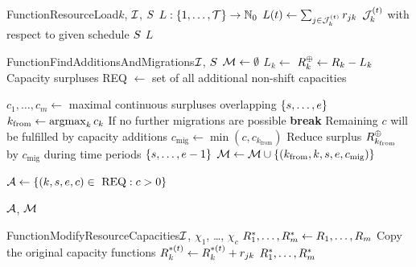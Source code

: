 \begin{alg}{Function}{ResourceLoad}{$k$, $\mathcal{I}$, $S$} \label{alg:resource-load}
\State $L : \{{1}, \dots, {\mathcal{T}}\} \to \mathbb{N}_0$
    \State $L(t) \gets \sum_{j \in \mathcal{J}_{k}^{(t)}} r_{j k}$
        \Comment $\mathcal{J}_{k}^{(t)}$ with respect to given schedule $S$
\EndFor
\State \Return $L$
\end{alg}


\begin{alg}{Function}{FindAdditionsAndMigrations}{$\mathcal{I}$, $S$} \label{alg:find-additions-and-migrations}
\State $\mathcal{M} \gets \emptyset$
 $L_k \gets$  \EndFor
{} $R_{k}^\oplus \gets R_{k} - L_k$ \Comment Capacity surpluses \EndFor
\State REQ $\gets$ set of all additional non-shift capacities

        \State $c_1, \dots, c_m \gets$ maximal continuous surpluses overlapping $\{{s}, \dots, {e}\}$
        \State $k_\text{from} \gets \operatorname*{\operatorname{argmax}}_k{c_k}$
         \Comment If no further migrations are possible
            \State \textbf{break} \Comment Remaining $c$ will be fulfilled by capacity additions
        \EndIf
        \State $c_\text{mig} \gets \min(c, c_{k_\text{from}})$
        \State Reduce surplus $R_{k_{\text{from}}}^\oplus$ by $c_{\text{mig}}$ during time periods $\{{s}, \dots, {e-1}\}$
        \State $\mathcal{M} \gets \mathcal{M} \cup \{ (k_\text{from}, k, s, e, c_{\text{mig}}) \}$
    \EndWhile
\EndFor

\State $\mathcal{A} \gets \left\{ (k, s, e, c) \in \text{ REQ} : c > 0 \right\}$

\State \Return $\mathcal{A}$, $\mathcal{M}$
\end{alg}


\begin{alg}{Function}{ModifyResourceCapacities}{$\mathcal{I}$, $\chi_1$, \dots, $\chi_c$} \label{alg:modify-resource-capacities}
\State $R_{1}^*, \dots, R_{m}^* \gets R_{1}, \dots, R_{m}$
    \Comment Copy the original capacity functions
            \State $\capacity{k}{t}^* \gets \capacity{k}{t}^* + \consumption{j}{k}$
        \EndFor
    \EndFor
\EndFor
\State \Return $R_{1}^*, \ldots, R_{m}^*$
\end{alg}


